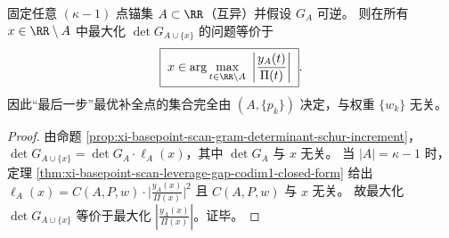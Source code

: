 

\begin{corollary}\label{cor:xi-basepoint-scan-doptimal-last-step-weight-free}
固定任意 \((\kappa-1)\) 点锚集 \(A\subset\RR\)（互异）并假设 \(G_A\) 可逆。
则在所有 \(x\in\RR\setminus A\) 中最大化 \(\det G_{A\cup\{x\}}\) 的问题等价于
\[
\boxed{\;
x\in\arg\max_{t\in\RR\setminus A}\ \left|\frac{y_A(t)}{\Pi(t)}\right|\; }.
\]
因此“最后一步”最优补全点的集合完全由 \((A,\{p_k\})\) 决定，与权重 \(\{w_k\}\) 无关。
\end{corollary}
\begin{proof}
由命题 \ref{prop:xi-basepoint-scan-gram-determinant-schur-increment}，
\(
\det G_{A\cup\{x\}}=\det G_A\cdot \ell_A(x)
\)，其中 \(\det G_A\) 与 \(x\) 无关。
当 \(|A|=\kappa-1\) 时，定理 \ref{thm:xi-basepoint-scan-leverage-gap-codim1-closed-form} 给出
\(
\ell_A(x)=C(A,P,w)\cdot\bigl|\frac{y_A(x)}{\Pi(x)}\bigr|^2
\)
且 \(C(A,P,w)\) 与 \(x\) 无关。
故最大化 \(\det G_{A\cup\{x\}}\) 等价于最大化 \(\left|\frac{y_A(x)}{\Pi(x)}\right|\)。证毕。
\end{proof}

\endinput

